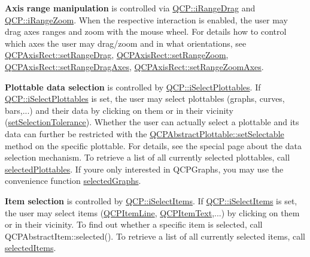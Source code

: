 {\bfseries Axis range manipulation} is controlled via \hyperlink{namespaceQCP_a2ad6bb6281c7c2d593d4277b44c2b037a2c4432b9aceafb94000be8d1b589ef18}{Q\+C\+P\+::i\+Range\+Drag} and \hyperlink{namespaceQCP_a2ad6bb6281c7c2d593d4277b44c2b037abee1e94353525a636aeaf0ba32b72e14}{Q\+C\+P\+::i\+Range\+Zoom}. When the respective interaction is enabled, the user may drag axes ranges and zoom with the mouse wheel. For details how to control which axes the user may drag/zoom and in what orientations, see \hyperlink{classQCPAxisRect_ae6aef2f7211ba6097c925dcd26008418}{Q\+C\+P\+Axis\+Rect\+::set\+Range\+Drag}, \hyperlink{classQCPAxisRect_a7960a9d222f1c31d558b064b60f86a31}{Q\+C\+P\+Axis\+Rect\+::set\+Range\+Zoom}, \hyperlink{classQCPAxisRect_a648cce336bd99daac4a5ca3e5743775d}{Q\+C\+P\+Axis\+Rect\+::set\+Range\+Drag\+Axes}, \hyperlink{classQCPAxisRect_a9442cca2aa358405f39a64d51eca13d2}{Q\+C\+P\+Axis\+Rect\+::set\+Range\+Zoom\+Axes}.

{\bfseries Plottable data selection} is controlled by \hyperlink{namespaceQCP_a2ad6bb6281c7c2d593d4277b44c2b037a67148c8227b4155eca49135fc274c7ec}{Q\+C\+P\+::i\+Select\+Plottables}. If \hyperlink{namespaceQCP_a2ad6bb6281c7c2d593d4277b44c2b037a67148c8227b4155eca49135fc274c7ec}{Q\+C\+P\+::i\+Select\+Plottables} is set, the user may select plottables (graphs, curves, bars,...) and their data by clicking on them or in their vicinity (\hyperlink{classQCustomPlot_a4dc31241d7b09680950e19e5f971ed93}{set\+Selection\+Tolerance}). Whether the user can actually select a plottable and its data can further be restricted with the \hyperlink{classQCPAbstractPlottable_ac238d6e910f976f1f30d41c2bca44ac3}{Q\+C\+P\+Abstract\+Plottable\+::set\+Selectable} method on the specific plottable. For details, see the special page about the data selection mechanism. To retrieve a list of all currently selected plottables, call \hyperlink{classQCustomPlot_a6721b8c689bb7f2f400987e580508fe8}{selected\+Plottables}. If you\textquotesingle{}re only interested in Q\+C\+P\+Graphs, you may use the convenience function \hyperlink{classQCustomPlot_ad2a0493bdd01e7aa99a4209ae3a5b67b}{selected\+Graphs}.

{\bfseries Item selection} is controlled by \hyperlink{namespaceQCP_a2ad6bb6281c7c2d593d4277b44c2b037aea2f7c105d674e76d9b187b02ef29260}{Q\+C\+P\+::i\+Select\+Items}. If \hyperlink{namespaceQCP_a2ad6bb6281c7c2d593d4277b44c2b037aea2f7c105d674e76d9b187b02ef29260}{Q\+C\+P\+::i\+Select\+Items} is set, the user may select items (\hyperlink{classQCPItemLine}{Q\+C\+P\+Item\+Line}, \hyperlink{classQCPItemText}{Q\+C\+P\+Item\+Text},...) by clicking on them or in their vicinity. To find out whether a specific item is selected, call Q\+C\+P\+Abstract\+Item\+::selected(). To retrieve a list of all currently selected items, call \hyperlink{classQCustomPlot_a1a48b13547e2d9ac5cd6927516f47a2e}{selected\+Items}.

